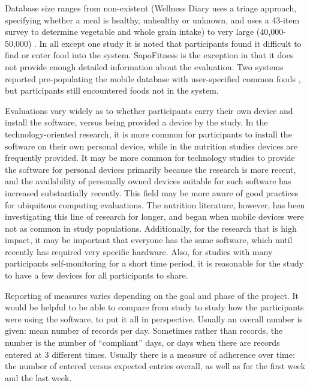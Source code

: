Database size ranges from non-existent (Wellness Diary \citep{mattila_mobile_2008} uses a triage approach, specifying whether a meal is healthy, unhealthy or unknown, and \citep{atienza_using_2008} uses a 43-item survey to determine vegetable and whole grain intake) to very large (40,000-50,000) \citep{yon_personal_2007}. In all except one study it is noted that participants found it difficult to find or enter food into the system. SapoFitness \citep{silva_sapofitness:_2011} is the exception in that it does not provide enough detailed information about the evaluation.  Two systems reported pre-populating the mobile database with user-specified common foods \citep{tsai_usability_2007,glanz_improving_2006}, but participants still encountered foods not in the system. 

Evaluations vary widely as to whether participants carry their own device and install the software, versus being provided a device by the study. In the technology-oriented research, it is more common for participants to install the software on their own personal device, while in the nutrition studies devices are frequently provided. It may be more common for technology studies to provide the software for personal devices primarily because the research is more recent, and the availability of personally owned devices suitable for such software has increased substantially recently. This field may be more aware of good practices for ubiquitous computing evaluations. The nutrition literature, however, has been investigating this line of research for longer, and began when mobile devices were not as common in study populations. Additionally, for the research that is high impact, it may be important that everyone has the same software, which until recently has required very specific hardware. Also, for studies with many participants self-monitoring for a short time period, it is reasonable for the study to have a few devices for all participants to share. 

Reporting of measures varies depending on the goal and phase of the project. It would be helpful to be able to compare from study to study how the participants were using the software, to put it all in perspective. Usually an overall number is given: mean number of records per day. Sometimes rather than records, the number is the number of ``compliant'' days, or days when there are records entered at 3 different times. Usually there is a measure of adherence over time: the number of entered versus expected entries overall, as well as for the first week and the last week. 


